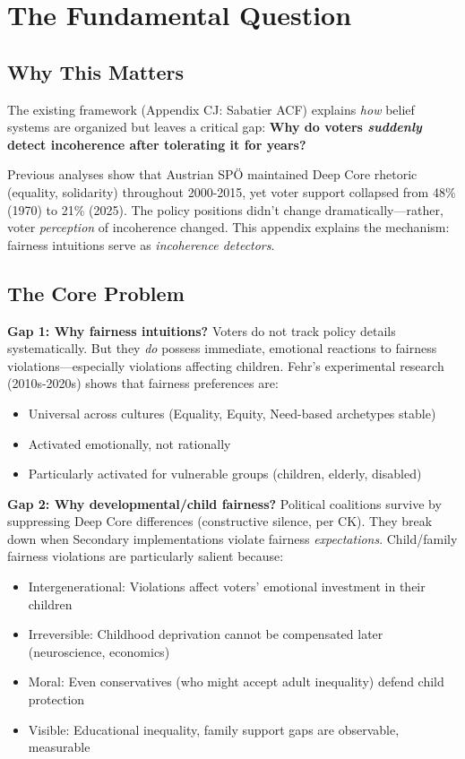\section{The Fundamental Question}
\label{sec:cm-fundamental}

\subsection{Why This Matters}

The existing framework (Appendix CJ: Sabatier ACF) explains \textit{how} belief systems are organized
but leaves a critical gap: \textbf{Why do voters \textit{suddenly} detect incoherence after tolerating
it for years?}

Previous analyses show that Austrian SPÖ maintained Deep Core rhetoric (equality, solidarity)
throughout 2000-2015, yet voter support collapsed from 48\% (1970) to 21\% (2025). The policy
positions didn't change dramatically---rather, voter \textit{perception} of incoherence changed.
This appendix explains the mechanism: fairness intuitions serve as \textit{incoherence detectors}.

\subsection{The Core Problem}

\textbf{Gap 1: Why fairness intuitions?}
Voters do not track policy details systematically. But they \textit{do} possess immediate,
emotional reactions to fairness violations---especially violations affecting children. Fehr's
experimental research (2010s-2020s) shows that fairness preferences are:
\begin{itemize}[nosep]
\item Universal across cultures (Equality, Equity, Need-based archetypes stable)
\item Activated emotionally, not rationally
\item Particularly activated for vulnerable groups (children, elderly, disabled)
\end{itemize}

\textbf{Gap 2: Why developmental/child fairness?}
Political coalitions survive by suppressing Deep Core differences (constructive silence, per CK).
They break down when Secondary implementations violate fairness \textit{expectations}. Child/family
fairness violations are particularly salient because:
\begin{itemize}[nosep]
\item Intergenerational: Violations affect voters' emotional investment in their children
\item Irreversible: Childhood deprivation cannot be compensated later (neuroscience, economics)
\item Moral: Even conservatives (who might accept adult inequality) defend child protection
\item Visible: Educational inequality, family support gaps are observable, measurable
\end{itemize}

